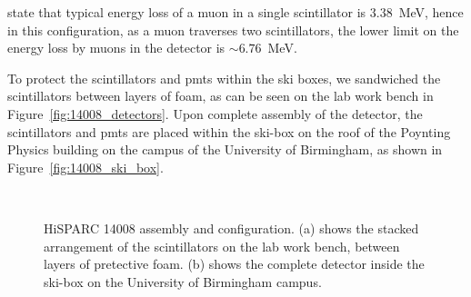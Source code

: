 \cite{bartels_hisparc_2012} state that typical energy loss of a muon in a single scintillator is $3.38$~MeV, hence in this configuration, as a muon traverses two scintillators, the lower limit on the energy loss by muons in the detector is $\sim 6.76$~MeV.

To protect the scintillators and \glspl{pmt} within the ski boxes, we sandwiched the scintillators between layers of foam, as can be seen on the lab work bench in Figure~\ref{fig:14008_detectors}. Upon complete assembly of the detector, the scintillators and \glspl{pmt} are placed within the ski-box on the roof of the Poynting Physics building on the campus of the University of Birmingham, as shown in Figure~\ref{fig:14008_ski_box}.

\begin{figure}[ht]
	\centering
	 \\
	
	\caption{HiSPARC 14008 assembly and configuration. (a) shows the stacked arrangement of the scintillators on the lab work bench, between layers of pretective foam. (b) shows the complete detector inside the ski-box on the University of Birmingham campus.}
	\label{fig:HS_14008_setup}
\end{figure}


